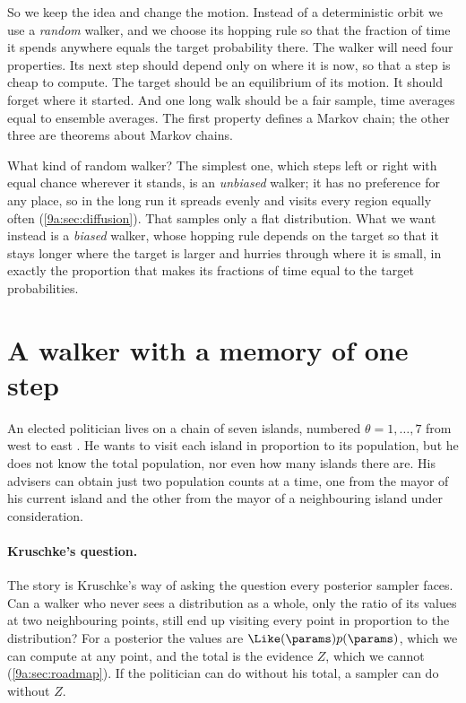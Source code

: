 So we keep the idea and change the motion. Instead of a deterministic orbit we use a
\emph{random} walker, and we choose its hopping rule so that the fraction of time it spends
anywhere equals the target probability there. The walker will need four properties. Its next
step should depend only on where it is now, so that a step is cheap to compute. The target
should be an equilibrium of its motion. It should forget where it started. And one long walk
should be a fair sample, time averages equal to ensemble averages. The first property defines
a Markov chain; the other three are theorems about Markov chains.

What kind of random walker? The simplest one, which steps left or right with equal chance
wherever it stands, is an \emph{unbiased} walker; it has no preference for any place, so in
the long run it spreads evenly and visits every region equally often
(\cref{9a:sec:diffusion}). That samples only a flat distribution. What we want instead is a
\emph{biased} walker, whose hopping rule depends on the target so that it stays longer where
the target is larger and hurries through where it is small, in exactly the proportion that
makes its fractions of time equal to the target probabilities.
\section{A walker with a memory of one step}
\label{9a:sec:markov}

An elected politician lives on a chain of seven islands, numbered $\theta=1,\dots,7$ from
west to east . He wants to visit each island in proportion to its
population, but he does not know the total population, nor even how many islands there are.
His advisers can obtain just two population counts at a time, one from the
mayor of his current island and the other from the mayor of a neighbouring
island under consideration.

\paragraph{Kruschke's question.}
The story is Kruschke's way of asking the question every posterior sampler faces. Can a walker
who never sees a distribution as a whole, only the ratio of its values at two neighbouring
points, still end up visiting every point in proportion to the distribution? For a posterior
the values are $\Like(\params)p(\params)$, which we can compute at any point, and the total is
the evidence $Z$, which we cannot (\cref{9a:sec:roadmap}). If the politician can do without
his total, a sampler can do without $Z$.

